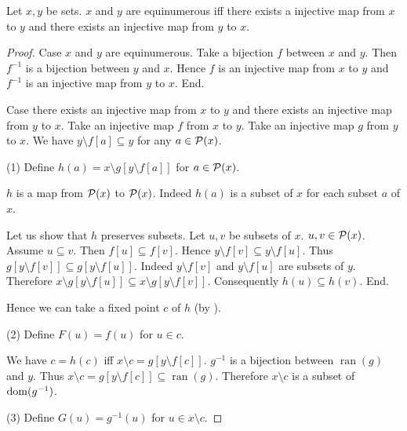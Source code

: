 \documentclass{article}
\newcommand{\pow}{{\cal P}}
\newcommand{\range}{\operatorname{ran}}
\newcommand{\inv}[1]{#1^{-1}}
\begin{document}
 \begin{forthel}

   \begin{theorem*}\label{CSB}
      Let $x,y$ be sets.
      $x$ and $y$ are equinumerous iff there exists a injective map from $x$ to
      $y$ and there exists an injective map from $y$ to $x$.
    \end{theorem*}
    \begin{proof}
      Case $x$ and $y$ are equinumerous.
        Take a bijection $f$ between $x$ and $y$.
        Then $\inv{f}$ is a bijection between $y$ and $x$.
        Hence $f$ is an injective map from $x$ to $y$ and $\inv{f}$ is an
        injective map from $y$ to $x$.
      End.

      Case there exists an injective map from $x$ to $y$ and there exists an
      injective map from $y$ to $x$.
        Take an injective map $f$ from $x$ to $y$.
        Take an injective map $g$ from $y$ to $x$.
        We have $y \setminus f[a] \subseteq y$ for any $a \in \pow(x)$.

        (1) Define $h(a) = x \setminus g[y \setminus f[a]]$ for $a \in \pow(x)$.

        $h$ is a map from $\pow(x)$ to $\pow(x)$.
        Indeed $h(a)$ is a subset of $x$ for each subset $a$ of $x$.

        Let us show that $h$ preserves subsets.
          Let $u, v$ be subsets of $x$. $u,v \in \pow(x)$.
          Assume $u \subseteq v$.
          Then $f[u] \subseteq f[v]$.
          Hence $y \setminus f[v] \subseteq y \setminus f[u]$.
          Thus $g[y \setminus f[v]] \subseteq g[y \setminus f[u]]$.
          Indeed $y \setminus f[v]$ and $y \setminus f[u]$ are subsets of $y$.
          Therefore $x \setminus g[y \setminus f[u]] \subseteq
          x \setminus g[y \setminus f[v]]$.
          Consequently $h(u) \subseteq h(v)$.
        End.

        Hence we can take a fixed point $c$ of $h$ (by ).

        (2) Define $F(u) = f(u)$ for $u \in c$.

        We have $c = h(c)$ iff $x \setminus c = g[y \setminus f[c]]$.
        $\inv{g}$ is a bijection between $\range(g)$ and $y$.
        Thus $x \setminus c = g[y \setminus f[c]] \subseteq \range(g)$.
        Therefore $x \setminus c$ is a subset of $\dom(\inv{g})$.

        (3) Define $G(u) = \inv{g}(u)$ for $u \in x \setminus c$.


\end{proof}
\end{forthel}
\end{document}
